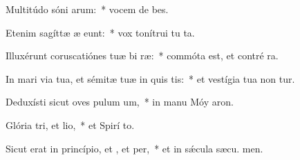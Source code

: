 \item Multitúdo sóni arum:~* vocem de bes.
\item Etenim sagíttæ æ eunt:~* vox tonítrui tu  ta.
\item Illuxérunt coruscatiónes tuæ bi ræ:~* commóta est, et contré ra.
\item In mari via tua, et sémitæ tuæ in quis tis:~* et vestígia tua non tur.
\item Deduxísti sicut oves pulum um,~* in manu Móy  aron.
\item Glória tri, et lio,~* et Spirí to.
\item Sicut erat in princípio, et , et per,~* et in sǽcula sæcu. men.
